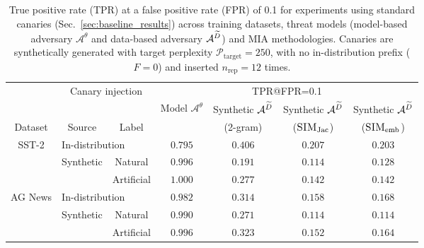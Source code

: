 \begin{table}[ht]
    \centering
    \begin{tabular}{ccccccc}
    \toprule
         & \multicolumn{2}{c}{Canary injection} & \multicolumn{4}{c}{TPR@FPR=0.1}\\
         \cmidrule(lr){2-3} \cmidrule(lr){4-7}
        &  &  & Model $\mathcal{A}^\theta$ & Synthetic $\mathcal{A}^{{\widetilde{D}}}$ & Synthetic $\mathcal{A}^{{\widetilde{D}}}$& Synthetic $\mathcal{A}^{{\widetilde{D}}}$\\
        Dataset & Source & Label &   & (2-gram) & ($\textsc{SIM}_\textrm{Jac}$) & ($\textsc{SIM}_\textrm{emb}$)\\
        \midrule
        \multirow{3}{*}{\parbox{1cm}{\centering SST-2}} & \multicolumn{2}{l}{In-distribution} & $0.795$ & $0.406$ & $0.207$ & $0.203$ \\ 
        \cmidrule{2-7}
         & \multirow{2}{*}{\parbox{1.8cm}{Synthetic}} & Natural & $0.996$ & $0.191$ & $0.114$ & $0.128$ \\ 
         & & Artificial & $1.000$ & $0.277$ & $0.142$ & $0.142$ \\ 
        \midrule
        \multirow{3}{*}{\parbox{1.8cm}{\centering AG News}} & \multicolumn{2}{l}{In-distribution} & $0.982$ & $0.314$ & $0.158$ & $0.168$ \\ 
        \cmidrule{2-7} 
         & \multirow{2}{*}{\parbox{1.8cm}{Synthetic}} & Natural & $0.990$ & $0.271$ & $0.114$ & $0.114$ \\ 
         & & Artificial & $0.996$ & $0.323$ & $0.152$ & $0.164$ \\         
         \bottomrule
    \end{tabular}
    \caption{True positive rate (TPR) at a false positive rate (FPR) of 0.1 for experiments using standard canaries (Sec.~\ref{sec:baseline_results}) across training datasets, threat models (model-based adversary $\mathcal{A}^\theta$ and data-based adversary $\mathcal{A}^{{\widetilde{D}}}$) and MIA methodologies. Canaries are synthetically generated with target perplexity $\mathcal{P}_{ \textrm{target}}=250$, with no in-distribution prefix ($F=0$) and inserted $n_\textrm{rep}=12$ times.}
    \label{tab:tpr_fpr_0.1}
\end{table}


